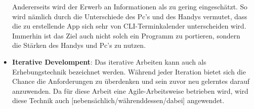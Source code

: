 \begin{itemize}
			Andererseits wird der Erwerb an Informationen als zu gering eingeschätzt. So wird nämlich durch die Unterschiede des Pc's und des Handys vermutet, dass die zu erstellende App sich sehr von CLI-Terminkalender unterscheiden wird. Immerhin ist das Ziel auch nicht solch ein Programm zu portieren, sondern die Stärken des Handys und Pc's zu nutzen.%
	\item \textbf{Iterative Develompent}: %
		Das iterative Arbeiten kann auch als Erhebungstechnik bezeichnet werden. Während jeder Iteration bietet sich die Chance die Anforderungen zu überdenken und sein zuvor neu gelerntes darauf anzuwenden. %
		Da für diese Arbeit eine Agile-Arbeitsweise betrieben wird, wird diese Technik auch [nebensächlich/währenddessen/dabei] angewendet.%
\end{itemize}


